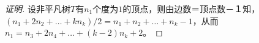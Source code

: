 \begin{proof}[证明]
  设非平凡树$T$有$n_1$个度为$1$的顶点，则由边数＝顶点数－１知，$(n_1 + 2n_2 + \ldots + kn_k)/2 = n_1 + n_2 + \ldots + n_k -1$，从而$n_1 = n_3 + 2n_4 + \ldots + (k-2)n_k + 2$。
\end{proof}
